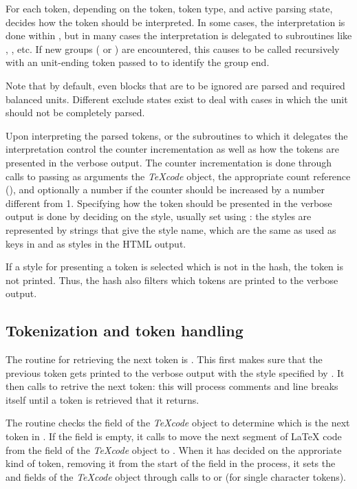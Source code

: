 \documentclass{article}
\newcommand\Obj[1]{\textsl{#1}}
\newcommand\wild{\ldots}
\begin{document}
For each token, depending on the token, token type, and active parsing state,  decides how the token should be interpreted. In some cases, the interpretation is done within , but in many cases the interpretation is delegated to subroutines like , , etc. If new groups (\code{\{\ldots\}} or ) are encountered, this causes  to be called recursively with an unit-ending token passed to  to identify the group end.
  
Note that by default, even blocks that are to be ignored are parsed and required balanced units. Different exclude states exist to deal with cases in which the unit should not be completely parsed.

Upon interpreting the parsed tokens,  or the subroutines to which it delegates the interpretation control the counter incrementation as well as how the tokens are presented in the verbose output. The counter incrementation is done through calls to  passing as arguments the \Obj{TeXcode} object, the appropriate count reference (\code{\$CNT_\wild}), and optionally a number if the counter should be increased by a number different from 1. Specifying how the token should be presented in the verbose output is done by deciding on the style, usually set using : the styles are represented by strings that give the style name, which are the same as used as keys in  and as styles in the HTML output.

If a style for presenting a token is selected which is not in the  hash, the token is not printed. Thus, the  hash also filters which tokens are printed to the verbose output.


\subsection{Tokenization and token handling}

The routine for retrieving the next token is . This first makes sure that the previous token gets printed to the verbose output with the style specified by . It then calls  to retrive the next token: this will process comments and line breaks itself until a token is retrieved that it returns.

The  routine checks the  field of the \Obj{TeXcode} object to determine which is the next token in . If the  field is empty, it calls  to move the next segment of \LaTeX{} code from the  field of the \Obj{TeXcode} object to . When it has decided on the approriate kind of token, removing it from the start of the  field in the process, it sets the  and  fields of the \Obj{TeXcode} object through calls to  or  (for single character tokens).
\end{document}

